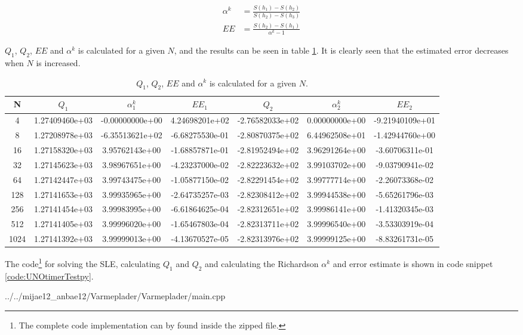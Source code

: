 \begin{equation}
\begin{align*}
\alpha ^{ k }&=\frac { S\left( h_{ 1 } \right) -S\left( h_{ 2 } \right)  }{ S\left( h_{ 2 } \right) -S\left( h_{ 3 } \right)  } \\
EE&=\frac { S\left( h_{ 2 } \right) -S\left( h_{ 1 } \right)  }{ \alpha ^{ k }-1 } 
\end{align*}
\label{eq:EE}
\end{equation}

\( Q_1  \), \( Q_2  \), \( EE \) and \( \alpha^k \) is calculated for a given \( N \), and the results can be seen in table \ref{tb:resultater1}. It is clearly seen that the estimated error decreases when $N$ is increased.


\begin{table}[th!]
\centering
\begin{tabular}{c|c|c|c|c|c|c}
 N &  \( Q_1 \) & \( { \alpha }_{  1}^{ k } \) & \(  EE_1 \) & \( Q_2 \) & \(  { \alpha }_{  2}^{ k } \) & \( EE_2 \)  \\\hline
4&1.27409460e+03&-0.00000000e+00&4.24698201e+02&-2.76582033e+02&0.00000000e+00&-9.21940109e+01\\
8&1.27208978e+03&-6.35513621e+02&-6.68275530e-01&-2.80870375e+02&6.44962508e+01&-1.42944760e+00\\
16&1.27158320e+03&3.95762143e+00&-1.68857871e-01&-2.81952494e+02&3.96291264e+00&-3.60706311e-01\\
32&1.27145623e+03&3.98967651e+00&-4.23237000e-02&-2.82223632e+02&3.99103702e+00&-9.03790941e-02\\
64&1.27142447e+03&3.99743475e+00&-1.05877150e-02&-2.82291454e+02&3.99777714e+00&-2.26073368e-02\\
128&1.27141653e+03&3.99935965e+00&-2.64735257e-03&-2.82308412e+02&3.99944538e+00&-5.65261796e-03\\
256&1.27141454e+03&3.99983995e+00&-6.61864625e-04&-2.82312651e+02&3.99986141e+00&-1.41320345e-03 \\
512&1.27141405e+03&3.99996020e+00&-1.65467803e-04&-2.82313711e+02&3.99996540e+00&-3.53303919e-04 \\
1024&1.27141392e+03&3.99999013e+00&-4.13670527e-05&-2.82313976e+02&3.99999125e+00&-8.83261731e-05 \\
\end{tabular}
\caption[tekst i indholdsfortegnelsen]{\( Q_1  \), \( Q_2  \), \( EE \) and \( \alpha^k \) is calculated for a given \( N \).}
\label{tb:resultater1}
\end{table}

 The code\footnote{The complete code implementation can by found inside the zipped file.} for solving the SLE, calculating $Q_1$ and $Q_2$ and calculating the Richardson $\alpha^k$ and error estimate is shown in code snippet \ref{code:UNOtimerTestpy}.

\newpage

{../../mijae12_anbae12/Varmeplader/Varmeplader/main.cpp}


